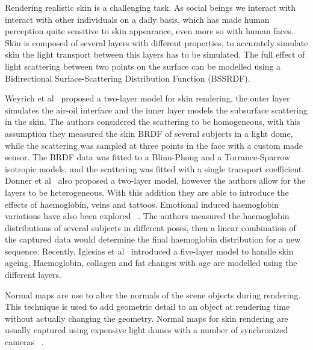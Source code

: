 \documentclass[11pt]{report}
\begin{document}
Rendering realistic skin is a challenging task.
As social beings we interact with interact with other individuals on a daily basis, which has made human perception quite sensitive to skin appearance, even more so with human faces.
Skin is composed of several layers with different properties, to accurately simulate skin the light transport between this layers has to be simulated.
The full effect of light scattering between two points on the surface can be modelled using a Bidirectional Surface-Scattering Distribution Function (BSSRDF).

Weyrich et al~\cite{Weyrich2006} proposed a two-layer model for skin rendering, the outer layer simulates the air-oil interface and the inner layer models the subsurface scattering in the skin.
The authors considered the scattering to be homogeneous, with this assumption they measured the skin BRDF of several subjects in a light dome, while the scattering was sampled at three points in the face with a custom made sensor.
The BRDF data was fitted to a Blinn-Phong and a Torrance-Sparrow isotropic models, and the scattering was fitted with a single transport coefficient.
Donner et al~\cite{Donner2008} also proposed a two-layer model, however the authors allow for the layers to be heterogeneous.
With this addition they are able to introduce the effects of haemoglobin, veins and tattoos.
Emotional induced haemoglobin variations have also been explored ~\cite{Jimenez2010}.
The authors measured the haemoglobin distributions of several subjects in different poses, then a linear combination of the captured data would determine the final haemoglobin distribution for a new sequence.
Recently, Iglesias et al~\cite{Iglesias2015} introduced a five-layer model to handle skin ageing.
Haemoglobin, collagen and fat changes with age are modelled using the different layers.

Normal maps are use to alter the normals of the scene objects during rendering.
This technique is used to add geometric detail to an object at rendering time without actually changing the geometry.
Normal maps for skin rendering are usually captured using expensive light domes with a number of synchronized cameras ~\cite{Graham2013, Weyrich2006}. 
\end{document}
